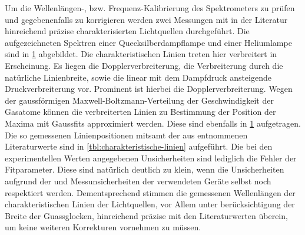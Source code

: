 \documentclass[../bericht.tex]{subfiles}
\begin{document}
        Um die Wellenlängen-, bzw. Frequenz-Kalibrierung des Spektrometers zu prüfen und gegebenenfalls zu korrigieren werden zwei Messungen mit in der Literatur hinreichend präzise charakterisierten Lichtquellen durchgeführt. Die aufgezeichneten Spektren einer Quecksilberdampflampe und einer Heliumlampe sind in \cref{fig:hg-he-spektren} abgebildet.  Die charakteristischen Linien treten hier verbreitert in Erscheinung. Es liegen die Dopplerverbreiterung, die Verbreiterung durch die natürliche Linienbreite, sowie die linear mit dem Dampfdruck ansteigende Druckverbreiterung vor. Prominent ist hierbei die Dopplerverbreiterung. Wegen der gaussförmigen Maxwell-Boltzmann-Verteilung der Geschwindigkeit der Gasatome können die verbreiterten Linien zu Bestimmung der Position der Maxima mit Gaussfits approximiert werden. Diese sind ebenfalls in \cref{fig:hg-he-spektren} aufgetragen. Die so gemessenen Linienpositionen mitsamt der aus \cite{NIST_ASD} entnommenen Literaturwerte sind in \cref{tbl:charakteristische-linien} aufgeführt. Die bei den experimentellen Werten angegebenen Unsicherheiten sind lediglich die Fehler der Fitparameter. Diese sind natürlich deutlich zu klein, wenn die Unsicherheiten aufgrund der  und Messunsicherheiten der verwendeten Geräte selbst noch respektiert werden. Dementsprechend stimmen die gemessenen Wellenlängen der charakteristischen Linien der Lichtquellen, vor Allem unter berücksichtigung der Breite der Guassglocken, hinreichend präzise mit den Literaturwerten überein, um keine weiteren Korrekturen vornehmen zu müssen.
        \medskip

        \begin{figure}[tb]
          \centering
          \caption{}
          \label{fig:hg-he-spektren}
        \end{figure}
\end{document}
